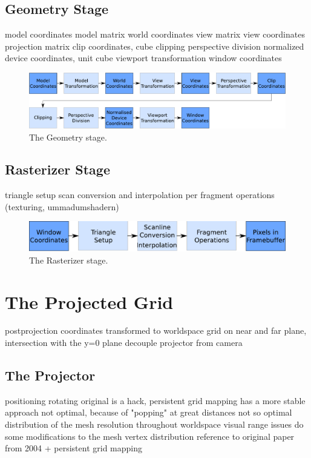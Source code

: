 \subsection{Geometry Stage}

model coordinates
model matrix
world coordinates
view matrix
view coordinates
projection matrix
clip coordinates, cube
clipping
perspective division
normalized device coordinates, unit cube
viewport transformation
window coordinates
\begin{figure}
\begin{center}
\includegraphics[scale=0.5]{Images/Geometry-Stage.pdf}
\caption{The Geometry stage.}
\label{fig:GeometryStage}
\end{center}
\end{figure}


\subsection{Rasterizer Stage}

triangle setup
scan conversion and interpolation
per fragment operations (texturing, ummadumshadern)
\begin{figure}
\begin{center}
\includegraphics[scale=0.5]{Images/Rasterizer-Stage.pdf}
\caption{The Rasterizer stage.}
\label{fig:RasterizerStage}
\end{center}
\end{figure}

\section{The Projected Grid}

postprojection coordinates transformed to worldspace
grid on near and far plane, intersection with the y=0 plane
decouple projector from camera

\subsection{The Projector}
positioning
rotating
original is a hack, persistent grid mapping has a more stable approach
not optimal, because of "popping" at great distances
not so optimal distribution of the mesh resolution throughout worldspace
visual range issues
do some modifications to the mesh vertex distribution
reference to original paper from 2004 + persistent grid mapping

